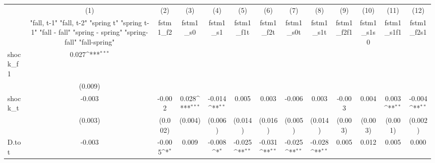 {
\def\sym#1{\ifmmode^{#1}\else\(^{#1}\)\fi}
\begin{tabular}{l*{12}{c}}
\toprule
            &\multicolumn{1}{c}{(1)}&\multicolumn{1}{c}{(2)}&\multicolumn{1}{c}{(3)}&\multicolumn{1}{c}{(4)}&\multicolumn{1}{c}{(5)}&\multicolumn{1}{c}{(6)}&\multicolumn{1}{c}{(7)}&\multicolumn{1}{c}{(8)}&\multicolumn{1}{c}{(9)}&\multicolumn{1}{c}{(10)}&\multicolumn{1}{c}{(11)}&\multicolumn{1}{c}{(12)}\\
            &\multicolumn{1}{c}{  "fall, t-1" "fall, t-2" "spring t" "spring t-1"  "fall - fall" "spring - spring" "spring-fall" "fall-spring" }&\multicolumn{1}{c}{fstm1\_f2}&\multicolumn{1}{c}{fstm1\_s0}&\multicolumn{1}{c}{fstm1\_s1}&\multicolumn{1}{c}{fstm1\_f1t}&\multicolumn{1}{c}{fstm1\_f2t}&\multicolumn{1}{c}{fstm1\_s0t}&\multicolumn{1}{c}{fstm1\_s1t}&\multicolumn{1}{c}{fstm1\_f2f1}&\multicolumn{1}{c}{fstm1\_s1s0}&\multicolumn{1}{c}{fstm1\_s1f1}&\multicolumn{1}{c}{fstm1\_f2s1}\\
\midrule
shock\_f1    &       0.027\sym{***}&                     &                     &                     &                     &                     &                     &                     &                     &                     &                     &                     \\
            &     (0.009)         &                     &                     &                     &                     &                     &                     &                     &                     &                     &                     &                     \\
\addlinespace
shock\_t     &      -0.003         &      -0.002         &       0.028\sym{***}&      -0.014\sym{**} &       0.005         &       0.003         &      -0.006         &       0.003         &      -0.003         &       0.004         &       0.003\sym{**} &      -0.004\sym{**} \\
            &     (0.003)         &     (0.002)         &     (0.004)         &     (0.006)         &     (0.014)         &     (0.016)         &     (0.005)         &     (0.014)         &     (0.003)         &     (0.003)         &     (0.001)         &     (0.002)         \\
\addlinespace
D.tot       &      -0.003         &      -0.005\sym{*}  &       0.009         &      -0.008\sym{*}  &      -0.025\sym{**} &      -0.031\sym{**} &      -0.025\sym{**} &      -0.028\sym{**} &       0.005         &       0.012         &       0.005         &       0.000         \\

\end{tabular}}
